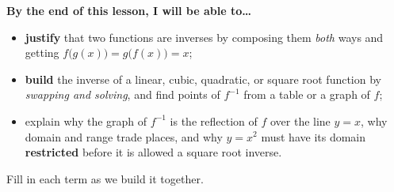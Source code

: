 \documentclass[10pt]{article}
\begin{document}
\namedateperiod

\vspace{0.08in}

\begin{objectivebox}
\textbf{By the end of this lesson, I will be able to\dots}
\begin{itemize}\setlength{\itemsep}{2pt}
  \item \textbf{justify} that two functions are inverses by composing them \emph{both} ways and getting $f\big(g(x)\big)=g\big(f(x)\big)=x$;
  \item \textbf{build} the inverse of a linear, cubic, quadratic, or square root function by \emph{swapping and solving}, and find points of $f^{-1}$ from a table or a graph of $f$;
  \item explain why the graph of $f^{-1}$ is the reflection of $f$ over the line $y=x$, why domain and range trade places, and why $y=x^{2}$ must have its domain \textbf{restricted} before it is allowed a square root inverse.
\end{itemize}
\end{objectivebox}

\vspace{0.05in}

\begin{vocabbox}
\small
Fill in each term as we build it together.
\par\vspace{2pt}   %
\end{vocabbox}
\end{document}
